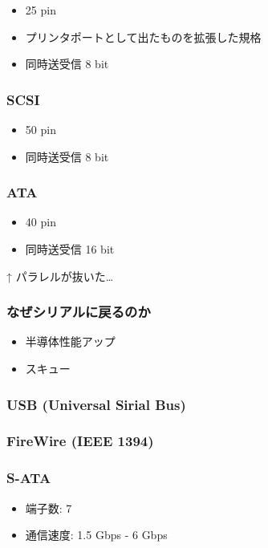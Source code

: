\documentclass{jsarticle}
\begin{document}
\begin{itemize}
\item
  25 pin
\item
  プリンタポートとして出たものを拡張した規格
\item
  同時送受信 8 bit
\end{itemize}
\subsubsection{SCSI}

\begin{itemize}
\item
  50 pin
\item
  同時送受信 8 bit
\end{itemize}
\subsubsection{ATA}

\begin{itemize}
\item
  40 pin
\item
  同時送受信 16 bit
\end{itemize}
↑ パラレルが抜いた\ldots{}

\subsubsection{なぜシリアルに戻るのか}

\begin{itemize}
\item
  半導体性能アップ
\item
  スキュー
\end{itemize}
\subsubsection{USB (Universal Sirial Bus)}

\subsubsection{FireWire (IEEE 1394)}

\subsubsection{S-ATA}

\begin{itemize}
\item
  端子数: 7
\item
  通信速度: 1.5 Gbps - 6 Gbps
\end{itemize}
\end{document}
